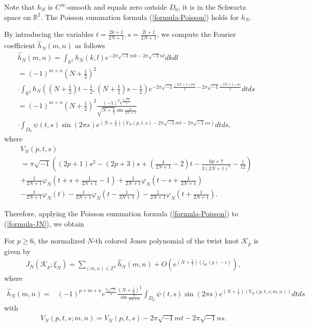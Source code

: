 \documentclass[12pt]{amsart}
\begin{document}
Note that $h_N$ is $C^{\infty}$-smooth and equals zero outside $D_0$, it is in the Schwartz space on $\mathbb{R}^2$. The Poisson summation formula (\ref{formula-Poisson}) holds for $h_N$. 

By introducing the variables $t=\frac{2k+1}{2N+1}, s=\frac{2l+1}{2N+1}$, 
we compute the Fourier coefficient $\hat{h}_{N}(m,n)$ as follows
\begin{align}
    &\hat{h}_{N}(m,n)=\int_{\mathbb{R}^2}h_N(k,l)e^{-2\pi \sqrt{-1}mk-2\pi \sqrt{-1}nl}dkdl\\\nonumber
    &=(-1)^{m+n}\left(N+\frac{1}{2}\right)^2\\\nonumber
    &\cdot\int_{\mathbb{R}^2}h_N\left((N+\frac{1}{2})t-\frac{1}{2},(N+\frac{1}{2})s-\frac{1}{2}\right)e^{-2\pi \sqrt{-1}\frac{(2N+1)mt}{2}-2\pi \sqrt{-1}\frac{(2N+1)ns}{2}}dtds\\\nonumber
    &=(-1)^{m+n}\left(N+\frac{1}{2}\right)^2\frac{(-1)^pe^{\frac{\pi\sqrt{-1}}{4}}}{\sqrt{N+\frac{1}{2}}\sin\frac{\pi}{2N+1}}\\\nonumber
    &\cdot\int_{D_0}\psi(t,s)\sin(2\pi s)e^{(N+\frac{1}{2})\left(V_N\left(p,t,s\right)-2\pi\sqrt{-1}mt-2\pi\sqrt{-1}ns\right)}dtds,
\end{align}
where
\begin{align}
    &V_N(p,t,s)\\\nonumber
    &=\pi \sqrt{-1}\left((2p+1)s^2-(2p+3)s+\left(\frac{4}{2N+1}-2\right)t-\frac{6p+7}{3(2N+1)^2}-\frac{1}{12}\right)\\\nonumber
    &+\frac{1}{2N+1}\varphi_N\left(t+s+\frac{1}{2N+1}-1\right)+\frac{1}{2N+1}\varphi_N\left(t-s+\frac{1}{2N+1}\right)\\\nonumber
    &-\frac{1}{2N+1}\varphi_N\left(t\right)-\frac{1}{2N+1}\varphi_N\left(t-\frac{1}{2N+1}\right)-\frac{1}{2N+1}\varphi_N\left(t+\frac{1}{2N+1}\right).
\end{align}

Therefore, applying the Poisson summation formula (\ref{formula-Poisson}) to (\ref{formula-JN}), we obtain
\begin{proposition} \label{prop-fouriercoeff}
For $p\geq 6$, the normalized $N$-th colored Jones polynomial of the twist knot $\mathcal{K}_{p}$ is given by 
\begin{align} \label{formula-fouriercoeff}
      J_N(\mathcal{K}_p;\xi_N)=\sum_{(m,n)\in \mathbb{Z}^2}\hat{h}_N(m,n)+O\left(e^{(N+\frac{1}{2})\left(\zeta_{\mathbb{R}}(p)-\epsilon\right)}\right),
\end{align}
where
  \begin{align}
      \hat{h}_N(m,n)=&(-1)^{p+m+n}e^{\frac{\pi\sqrt{-1}}{4}}\frac{\left(N+\frac{1}{2}\right)^{\frac{3}{2}}}{\sin\frac{\pi}{2N+1}} \int_{D_0}\psi(t,s)\sin(2\pi s)e^{(N+\frac{1}{2})\left(V_N\left(p,t,s;m,n\right)\right)}dtds
\end{align}
with
\begin{align}
V_N\left(p,t,s;m,n\right)=V_N\left(p,t,s\right)-2\pi\sqrt{-1}mt-2\pi\sqrt{-1}ns.
\end{align}
\end{proposition}
\end{document}
